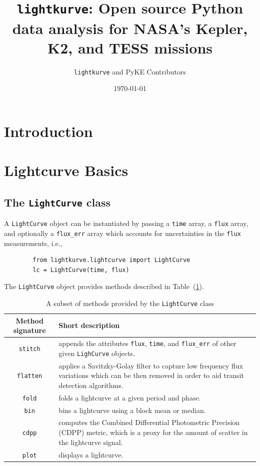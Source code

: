\documentclass{article}
\title{\texttt{lightkurve}: Open source Python data analysis for NASA's Kepler, K2, and TESS missions}
\author{\texttt{lightkurve} and PyKE Contributors}
\date{\today}
\begin{document}
\maketitle

\begin{abstract}

\end{abstract}

\section{Introduction}

\section{Lightcurve Basics}
    \subsection{The \texttt{LightCurve} class}
        A \texttt{LightCurve} object can be instantiated by passing a \texttt{time}
        array, a \texttt{flux} array, and optionally a \texttt{flux\_err} array which
        accounts for uncertainties in the \texttt{flux} measurements, i.e.,
        \begin{verbatim}
        from lightkurve.lightcurve import LightCurve
        lc = LightCurve(time, flux)
        \end{verbatim}

        The \texttt{LightCurve} object provides methods described in
        Table~(\ref{tab:methods}).

        \begin{table}[!htb]
            \centering
            \caption{A subset of methods provided by the \texttt{LightCurve} class}
            \begin{tabular}{cp{12cm}}
                \hline
                \textbf{Method signature} & \textbf{Short description} \\
                \hline
                \texttt{stitch} & appends the attributes \texttt{flux},
                \texttt{time}, and \texttt{flux\_err} of other given
                \texttt{LighCurve} objects.\\
                \texttt{flatten} & applies a Savitzky-Golay filter to capture
                low frequency flux variations which can be then removed in order
                to aid transit detection algorithms.\\
                \texttt{fold} & folds a lightcurve at a given period and phase.\\
                \texttt{bin} &  bins a lightcurve using a block mean or median.\\
                \texttt{cdpp} &  computes the Combined Differential Photometric
                Precision (CDPP) metric, which is a proxy for the amount of
                scatter in the lightcurve signal. \\
                \texttt{plot} & displays a lightcurve.
            \end{tabular}
            \label{tab:methods}
        \end{table}
\end{document}
